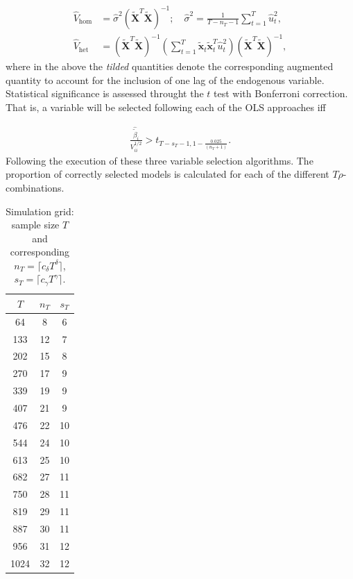 \documentclass[10pt,a4paper,oneside]{article}
\begin{document}
\begin{align*}
    \hat{V}_{\mathrm{hom}} &= \hat{\sigma}^2(\tilde{\boldsymbol{X}}^T \tilde{\boldsymbol{X}})^{-1}; \quad  \hat{\sigma}^2 = \frac{1}{T - n_T - 1}\sum^{T}_{t = 1} \hat{u}_t^2,\\
    \hat{V}_{\mathrm{het}} &= (\tilde{\boldsymbol{X}}^T \tilde{\boldsymbol{X}})^{-1} \left( \sum^T_{t = 1} \tilde{\mathbf{x}}_t \tilde{\mathbf{x}}^T_t \hat{u}^2_t \right) (\tilde{\boldsymbol{X}}^T \tilde{\boldsymbol{X}})^{-1},
\end{align*}
where in the above the \textit{tilded} quantities denote the corresponding augmented quantity to account for the inclusion of one lag of the endogenous variable. Statistical significance is assessed throught the $t$ test with Bonferroni correction. That is, a variable will be selected following each of the OLS approaches iff

\begin{align*}
    \frac{\hat{\tilde{\beta}}_i}{V_{ii}^{1 / 2}} > t_{T - s_T - 1, 1 - \frac{0.025}{(n_T + 1)}}.
\end{align*}
Following the execution of these three variable selection algorithms. The proportion of correctly selected models is calculated for each of the different $T \rho$-combinations.


\begin{table}[ht]
  \caption{Simulation grid: sample size $T$ and corresponding $n_{T}=\lceil c_{\delta} T^{\delta}\rceil$, $s_{T}=\lceil c_{\gamma}T^{\gamma}\rceil$.}
  \label{tab:simulation_grid}

\centering
\begin{tabular}{ccc}
\toprule
$T$   & $n_{T}$ & $s_{T}$ \\
\midrule
64    &  8  &  6  \\
133   & 12  &  7  \\
202   & 15  &  8  \\
270   & 17  &  9  \\
339   & 19  &  9  \\
407   & 21  &  9  \\
476   & 22  & 10  \\
544   & 24  & 10  \\
613   & 25  & 10  \\
682   & 27  & 11  \\
750   & 28  & 11  \\
819   & 29  & 11  \\
887   & 30  & 11  \\
956   & 31  & 12  \\
1024  & 32  & 12  \\
\bottomrule
\end{tabular}

\end{table}
\end{document}
